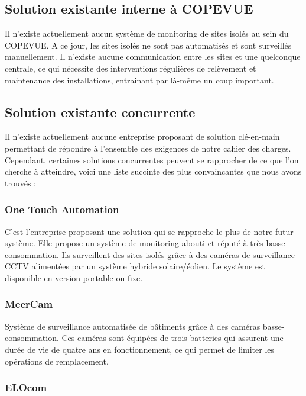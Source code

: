 \subsection{Solution existante interne à COPEVUE}

Il n’existe actuellement aucun système de monitoring de sites isolés au sein du COPEVUE. A ce jour, les sites isolés ne sont pas automatisés et sont surveillés manuellement. Il n’existe aucune communication entre les sites et une quelconque centrale, ce qui nécessite des interventions régulières de relèvement et maintenance des installations, entrainant par là-même un coup important.

\subsection{Solution existante concurrente}

Il n’existe actuellement aucune entreprise proposant de solution clé-en-main permettant de répondre à l'ensemble des exigences de notre cahier des charges. Cependant, certaines solutions concurrentes peuvent se rapprocher de ce que l'on cherche à atteindre, voici une liste succinte des plus convaincantes que nous avons trouvés :

\subsubsection{One Touch Automation}

C’est l’entreprise proposant une solution qui se rapproche le plus de notre futur système.
Elle propose un système de monitoring abouti et réputé à très basse consommation. Ils surveillent des sites isolés grâce à des caméras de surveillance CCTV alimentées par un système hybride solaire/éolien. Le système est disponible en version portable ou fixe.

\subsubsection{MeerCam}

Système de surveillance automatisée de bâtiments grâce à des caméras basse-consommation. Ces caméras sont équipées de trois batteries qui assurent une durée de vie de quatre ans en fonctionnement, ce qui permet de limiter les opérations de remplacement.

\subsubsection{ELOcom}

